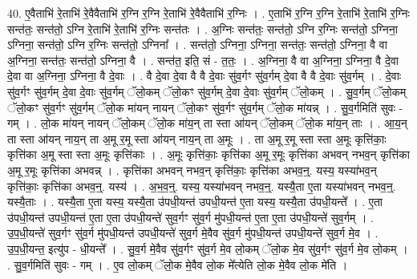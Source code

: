 \documentclass[17pt]{extarticle}
\begin{document}
40. ए॒वैताभि॑ रे॒ताभि॑ रे॒वैवैताभि॑ र॒ग्नि र॒ग्नि रे॒ताभि॑ रे॒वैवैताभि॑ र॒ग्निः । . ए॒ताभि॑ र॒ग्नि र॒ग्नि रे॒ताभि॑ रे॒ताभि॑ र॒ग्निः सन्त॑तः॒ सन्त॑तो॒ ऽग्नि रे॒ताभि॑ रे॒ताभि॑ र॒ग्निः सन्त॑तः । . अ॒ग्निः सन्त॑तः॒ सन्त॑तो॒ ऽग्नि र॒ग्निः सन्त॑तो॒ ऽग्निना॒ ऽग्निना॒ सन्त॑तो॒ ऽग्नि र॒ग्निः सन्त॑तो॒ ऽग्निना᳚ । . सन्त॑तो॒ ऽग्निना॒ ऽग्निना॒ सन्त॑तः॒ सन्त॑तो॒ ऽग्निना॒ वै वा अ॒ग्निना॒ सन्त॑तः॒ सन्त॑तो॒ ऽग्निना॒ वै । . सन्त॑त॒ इति॒ सं - त॒तः॒ । . अ॒ग्निना॒ वै वा अ॒ग्निना॒ ऽग्निना॒ वै दे॒वा दे॒वा वा अ॒ग्निना॒ ऽग्निना॒ वै दे॒वाः । . वै दे॒वा दे॒वा वै वै दे॒वाः सु॑व॒र्गꣳ सु॑व॒र्गम् दे॒वा वै वै दे॒वाः सु॑व॒र्गम् । . दे॒वाः सु॑व॒र्गꣳ सु॑व॒र्गम् दे॒वा दे॒वाः सु॑व॒र्गम् ॅलो॒कम् ॅलो॒कꣳ सु॑व॒र्गम् दे॒वा दे॒वाः सु॑व॒र्गम् ॅलो॒कम् । . सु॒व॒र्गम् ॅलो॒कम् ॅलो॒कꣳ सु॑व॒र्गꣳ सु॑व॒र्गम् ॅलो॒क मा॑यन् नायन् ॅलो॒कꣳ सु॑व॒र्गꣳ सु॑व॒र्गम् ॅलो॒क मा॑यन्न् । . सु॒व॒र्गमिति॑ सुवः - गम् । . लो॒क मा॑यन् नायन् ॅलो॒कम् ॅलो॒क मा॑य॒न् ता स्ता आ॑यन् ॅलो॒कम् ॅलो॒क मा॑य॒न् ताः । . आ॒य॒न् ता स्ता आ॑यन् नाय॒न् ता अ॒मू र॒मू स्ता आ॑यन् नाय॒न् ता अ॒मूः । . ता अ॒मू र॒मू स्ता स्ता अ॒मूः कृत्ति॑काः॒ कृत्ति॑का अ॒मू स्ता स्ता अ॒मूः कृत्ति॑काः । . अ॒मूः कृत्ति॑काः॒ कृत्ति॑का अ॒मू र॒मूः कृत्ति॑का अभवन् नभव॒न् कृत्ति॑का अ॒मू र॒मूः कृत्ति॑का अभवन्न् । . कृत्ति॑का अभवन् नभव॒न् कृत्ति॑काः॒ कृत्ति॑का अभव॒न्॒. यस्य॒ यस्या॑भव॒न् कृत्ति॑काः॒ कृत्ति॑का अभव॒न्॒. यस्य॑ । . अ॒भ॒व॒न्॒. यस्य॒ यस्या॑भवन् नभव॒न्॒. यस्यै॒ता ए॒ता यस्या॑भवन् नभव॒न्॒. यस्यै॒ताः । . यस्यै॒ता ए॒ता यस्य॒ यस्यै॒ता उ॑पधी॒यन्त॑ उपधी॒यन्त॑ ए॒ता यस्य॒ यस्यै॒ता उ॑पधी॒यन्ते᳚ । . ए॒ता उ॑पधी॒यन्त॑ उपधी॒यन्त॑ ए॒ता ए॒ता उ॑पधी॒यन्ते॑ सुव॒र्गꣳ सु॑व॒र्ग मु॑पधी॒यन्त॑ ए॒ता ए॒ता उ॑पधी॒यन्ते॑ सुव॒र्गम् । . उ॒प॒धी॒यन्ते॑ सुव॒र्गꣳ सु॑व॒र्ग मु॑पधी॒यन्त॑ उपधी॒यन्ते॑ सुव॒र्ग मे॒वैव सु॑व॒र्ग मु॑पधी॒यन्त॑ उपधी॒यन्ते॑ सुव॒र्ग मे॒व । . उ॒प॒धी॒यन्त॒ इत्यु॑प - धी॒यन्ते᳚ । . सु॒व॒र्ग मे॒वैव सु॑व॒र्गꣳ सु॑व॒र्ग मे॒व लो॒कम् ॅलो॒क मे॒व सु॑व॒र्गꣳ सु॑व॒र्ग मे॒व लो॒कम् । . सु॒व॒र्गमिति॑ सुवः - गम् । . ए॒व लो॒कम् ॅलो॒क मे॒वैव लो॒क मे᳚त्येति लो॒क मे॒वैव लो॒क मे॑ति । \newline
\pagebreak
{}
\end{document}
